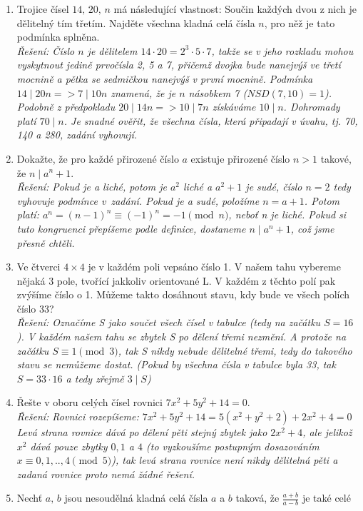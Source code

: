 \documentclass[12pt,a4paper]{report}
\begin{document}
\begin{enumerate}
	\item Trojice čísel $14,\, 20,\, n$ má následující vlastnost: Součin každých dvou z nich je dělitelný tím třetím. Najděte všechna kladná celá čísla $n$, pro něž je tato podmínka splněna.
	\\ \textit{Řešení: Číslo $n$ je dělitelem $14\cdot20 = 2^3
		\cdot5 \cdot 7$, takže se v jeho rozkladu mohou vyskytnout jedině prvočísla 2, 5 a 7, přičemž dvojka bude nanejvýš ve třetí mocnině a pětka se sedmičkou nanejvýš v první mocnině.
		Podmínka $14 \mid 20n => 7 \mid 10 n$ znamená, že je $n$ násobkem 7 ($NSD(7,10)=1$). Podobně z předpokladu $20 \mid 14n => 10 \mid 7n$ získáváme $10 \mid n$.
		Dohromady platí $70 \mid n$. Je snadné ověřit, že všechna čísla, která připadají v úvahu, tj. 70, 140 a 280, zadání vyhovují.}
	\item Dokažte, že pro každé přirozené číslo $a$ existuje přirozené číslo $n > 1$ takové, že $n \mid a^n + 1$.
	\\ \textit{Řešení: Pokud je a liché, potom je $a^2$ liché a $a^2 + 1$ je sudé, číslo $n = 2$ tedy vyhovuje podmínce v~zadání. Pokud je a sudé, položíme $n = a + 1$. Potom platí: $a^n=(n-1)^n \equiv (-1)^n=	-1 \pmod n$, neboť n je liché. Pokud si tuto kongruenci přepíšeme podle definice, dostaneme $n \mid a^n + 1$, což jsme přesně chtěli.}
	\item Ve čtverci $4\times4$ je v každém poli vepsáno číslo 1. V našem tahu vybereme nějaká 3 pole, tvořící jakkoliv orientované L. V každém z těchto polí pak zvýšíme číslo o 1. Můžeme takto dosáhnout stavu, kdy bude ve všech polích číslo 33?
	\\ \textit{Řešení: Označíme S jako součet všech čísel v tabulce (tedy na začátku $S=16$). V každém našem tahu se zbytek S po dělení třemi nezmění. A protože na začátku $S\equiv1\pmod3$, tak S nikdy nebude dělitelné třemi, tedy do takového stavu se nemůžeme dostat. (Pokud by všechna čísla v tabulce byla 33, tak $S=33\cdot16$ a tedy zřejmě $3\mid S$)}
	\item Řešte v oboru celých čísel rovnici $7x^2+5y^2+14=0$.
	\\ \textit{Řešení: Rovnici rozepíšeme: $7x^2+5y^2+14=5(x^2+y^2+2)+2x^2+4=0$ Levá strana rovnice dává po dělení pěti stejný zbytek jako $2x^2 + 4$, ale jelikož $x^2$ dává pouze zbytky $0, 1$ a $4$ (to vyzkoušíme postupným dosazováním $x\equiv 0,1,..,4 \pmod 5 $), tak levá strana rovnice není nikdy dělitelná pěti a zadaná rovnice proto nemá žádné řešení.}
	\item Nechť $a,\,b$ jsou nesoudělná kladná celá čísla $a$ a $b$ taková, že $\frac{a+b}{a-b}$ je také celé

\end{enumerate}
\end{document}
